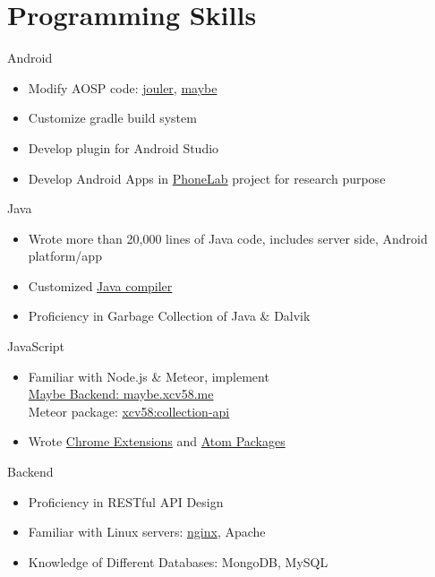 \section{Programming Skills}
\cvcomputer
{Android}{
\begin{itemize}
  \item Modify AOSP code:
  \href{http://platform.phone-lab.org:8080/gitweb?p=platform/frameworks/base.git;a=search;h=refs/heads/experiment/1/jouler;s=Yihong+Chen;st=author}{jouler},
  \href{http://platform.phone-lab.org:8080/gitweb?p=platform/frameworks/base.git;a=search;h=refs/heads/experiment/3/maybe;s=Yihong+Chen;st=author}{maybe}
  \item Customize gradle build system
  \item Develop plugin for Android Studio
  \item Develop Android Apps in
  \href{https://phone-lab.org/}{PhoneLab} project for research purpose
\end{itemize}
}
{Java}{
\begin{itemize}
  \item Wrote more than 20,000 lines of Java code, includes server side, Android platform/app
  \item Customized \href{https://github.com/blue-systems-group/project.maybe.polyglot}{Java compiler}
  \item Proficiency in Garbage Collection of Java \& Dalvik
\end{itemize}
}

\cvcomputer
{JavaScript}{
\begin{itemize}
  \item Familiar with Node.js \& Meteor, implement
  \\\href{http://maybe.cse.buffalo.edu}{Maybe Backend: maybe.xcv58.me}
  \\Meteor package:
  \href{https://atmospherejs.com/xcv58/collection-api}{xcv58:collection-api}
  \item Wrote \href{https://chrome.google.com/webstore/search/xcv58?hl=en}{Chrome Extensions} and
  \href{https://atom.io/users/xcv58}{Atom Packages}
\end{itemize}
}
{Backend}{
\begin{itemize}
  \item Proficiency in RESTful API Design
  \item Familiar with Linux servers:
  \href{https://github.com/xcv58/nginx-config}{nginx}, Apache
  \item Knowledge of Different Databases: MongoDB, MySQL
\end{itemize}
}


